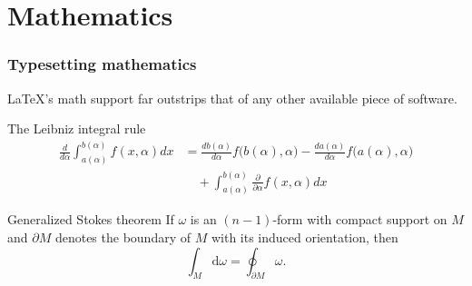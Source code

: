 \documentclass[ignorenonframetext]{beamer}
\begin{document}
\section{Mathematics}
\begin{frame}
  \frametitle{Typesetting mathematics}
  \LaTeX's math support far outstrips that of any other available
  piece of software.
  \begin{block}{The Leibniz integral rule}
    \begin{align*}
      \frac{d}{d\alpha} \int_{a(\alpha)}^{b(\alpha)} f(x,\alpha) dx &= \frac{db(\alpha)}{d\alpha} f\big(b(\alpha), \alpha\big) - \frac{da(\alpha)}{d\alpha}f\big(a(\alpha),\alpha\big)\\ &\quad + \int_{a(\alpha)}^{b(\alpha)} \frac{\partial}{\partial\alpha} f(x,\alpha) dx
    \end{align*}
  \end{block}
  \begin{block}{Generalized Stokes theorem}
    If $\omega$ is an $(n-1)$-form with compact support on $M$ and
    $\partial M$ denotes the boundary of $M$ with its induced
    orientation, then
    \begin{equation*}
      \int_M \text{d}\omega = \oint_{\partial M} \omega.
    \end{equation*}
  \end{block}
\end{frame}
\end{document}
